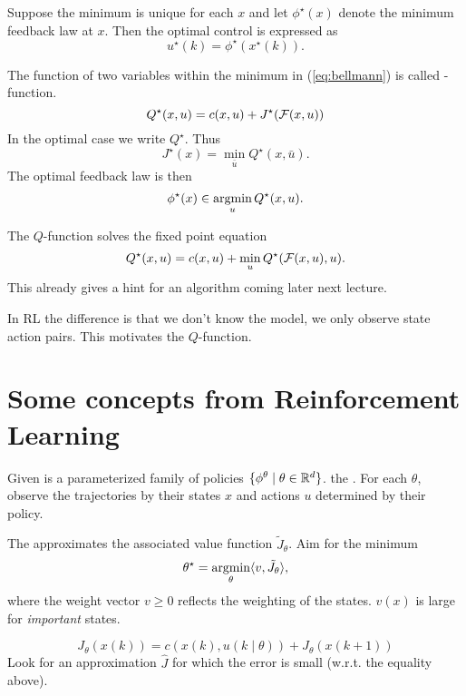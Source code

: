 Suppose the minimum is unique for each \(x\) and let \(\phi^\star(x)\) denote 
the minimum feedback law at \(x\). Then the optimal control is expressed as 
\[u^\star(k)=\phi^\star(x^\star(k)).\]

\begin{definition}[Q-function]\label{def:1.14}
    The function of two variables within the minimum in (\ref{eq:bellmann}) is called -function.
    \[Q^\star(x,u)=c(x,u)+J^\star(\mathcal{F}(x,u))\]
    In the optimal case we write \(Q^\star\). Thus 
    \[J^\star(x)=\min_{\bar{u}}Q^\star(x,\bar{u}).\] 
    The optimal feedback law is then 
    \[\phi^\star(x)\in\operatorname*{\text{argmin}}_{u}Q^\star(x,u).\]    
\end{definition} %

The \(Q\)-function solves the fixed point equation 
\[Q^\star(x,u)=c(x,u)+\min_{u}Q^\star(\mathcal{F}(x,u),u).\]
This already gives a hint for an algorithm coming later next lecture.

\begin{remark}
    In RL the difference is that we don't know the model, we only observe state action pairs.
    This motivates the \(Q\)-function.        
\end{remark}

\section*{Some concepts from Reinforcement Learning}


Given is a parameterized family of policies \(\{\phi^\theta\mid \theta\in \mathbb{R}^d\}\).
the . For each \(\theta\), observe the trajectories by their states 
\(x\) and actions \(u\) determined by their policy.

The  approximates the associated value function 
\(\tilde{J}_\theta\). Aim for the minimum 
\[\theta^\star=\operatorname*{\text{argmin}}_{\theta}\langle v, \tilde{J}_\theta \rangle,\]
where the weight vector \(v\geq 0\) reflects the weighting of the states. \(v(x)\) is large for \textit{important} states.


\[J_\theta(x(k))=c(x(k),u(k\mid\theta))+J_\theta(x(k+1))\]
Look for an approximation \(\hat{J}\) for which the error is small (w.r.t. the equality above).


